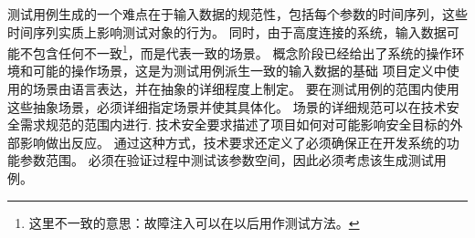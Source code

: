 测试用例生成的一个难点在于输入数据的规范性，包括每个参数的时间序列，这些时间序列实质上影响测试对象的行为。
同时，由于高度连接的系统，输入数据可能不包含任何不一致\footnote{这里不一致的意思：故障注入可以在以后用作测试方法。}，而是代表一致的场景。
概念阶段已经给出了系统的操作环境和可能的操作场景，这是为测试用例派生一致的输入数据的基础
项目定义中使用的场景由语言表达，并在抽象的详细程度上制定。
要在测试用例的范围内使用这些抽象场景，必须详细指定场景并使其具体化。
场景的详细规范可以在技术安全需求规范的范围内进行\cite[part 4, section 6]{ISO_26262_2011}.
技术安全要求描述了项目如何对可能影响安全目标的外部影响做出反应。
通过这种方式，技术要求还定义了必须确保正在开发系统的功能参数范围。
必须在验证过程中测试该参数空间，因此必须考虑该生成测试用例。
